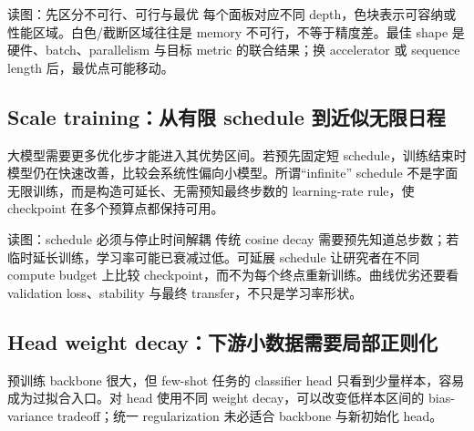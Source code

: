 
\begin{knowledgebox}{读图：先区分不可行、可行与最优}
每个面板对应不同 depth，色块表示可容纳或性能区域。白色/截断区域往往是 memory 不可行，不等于精度差。最佳 shape 是硬件、batch、parallelism 与目标 metric 的联合结果；换 accelerator 或 sequence length 后，最优点可能移动。
\end{knowledgebox}

\subsection{Scale training：从有限 schedule 到近似无限日程}

大模型需要更多优化步才能进入其优势区间。若预先固定短 schedule，训练结束时模型仍在快速改善，比较会系统性偏向小模型。所谓“infinite” schedule 不是字面无限训练，而是构造可延长、无需预知最终步数的 learning-rate rule，使 checkpoint 在多个预算点都保持可用。


\begin{knowledgebox}{读图：schedule 必须与停止时间解耦}
传统 cosine decay 需要预先知道总步数；若临时延长训练，学习率可能已衰减过低。可延展 schedule 让研究者在不同 compute budget 上比较 checkpoint，而不为每个终点重新训练。曲线优劣还要看 validation loss、stability 与最终 transfer，不只是学习率形状。
\end{knowledgebox}


\subsection{Head weight decay：下游小数据需要局部正则化}

预训练 backbone 很大，但 few-shot 任务的 classifier head 只看到少量样本，容易成为过拟合入口。对 head 使用不同 weight decay，可以改变低样本区间的 bias-variance tradeoff；统一 regularization 未必适合 backbone 与新初始化 head。


